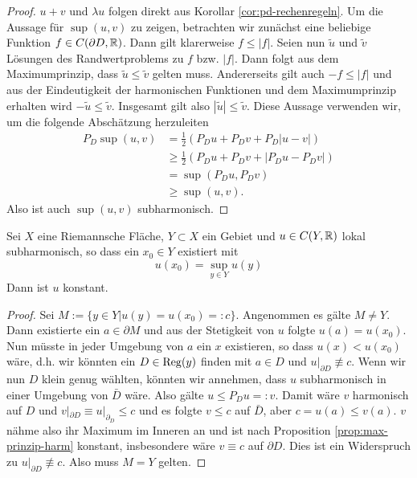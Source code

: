 \begin{proof}
  $u+v$ und $\lambda u$ folgen direkt aus Korollar
  \ref{cor:pd-rechenregeln}. Um die Aussage für $\sup(u,v)$ zu zeigen,
  betrachten wir zunächst eine beliebige Funktion $f \in C(\partial D,
  \mathbb{R})$. Dann gilt klarerweise $f \leq |f|$. Seien nun $\tilde u$ und
  $\tilde v$ Lösungen des Randwertproblems zu $f$ bzw. $|f|$. Dann
  folgt aus dem Maximumprinzip, dass $\tilde u \leq \tilde v$ gelten
  muss. Andererseits gilt auch $-f \leq |f|$ und aus der Eindeutigkeit
  der harmonischen Funktionen und dem Maximumprinzip erhalten wird $-
  \tilde u \leq \tilde v$. Insgesamt gilt also $|\tilde u| \leq \tilde
  v$. Diese Aussage verwenden wir, um die folgende Abschätzung herzuleiten
  \begin{align*}
    P_D \sup(u,v) & = \frac{1}{2} ( P_D u + P_D v + P_D|u - v|) \\
    & \geq \frac12 (P_D u + P_D v + |P_D u - P_D v|) \\
    & = \sup(P_D u, P_D v) \\
    & \geq \sup(u,v).
  \end{align*}
  Also ist auch $\sup(u,v)$ subharmonisch.
\end{proof}

\begin{thm}
  Sei $X$ eine Riemannsche Fläche, $Y \subset X$ ein Gebiet und $u
  \in C(Y, \mathbb{R})$ lokal subharmonisch, so dass ein $x_0 \in Y$ existiert
  mit
  \[
  u(x_0) = \sup_{y\in Y} u(y)
  \]
  Dann ist $u$ konstant.
\end{thm}

\begin{proof}
  Sei $M:= \{y \in Y | u(y) = u(x_0) =: c \}$. Angenommen es gälte $M \neq
  Y$. Dann existierte ein $a \in \partial M$ und aus der Stetigkeit
  von $u$ folgte $u(a) = u(x_0)$. Nun müsste in jeder Umgebung von $a$
  ein $x$ existieren, so dass $u(x) < u(x_0)$ wäre, d.h. wir könnten ein
  $D \in \operatorname{Reg}(y)$ finden mit $a \in D$ und $u|_{\partial D} \not
  \equiv c$. Wenn wir nun $D$ klein genug wählten, könnten wir annehmen, dass $u$
  subharmonisch in einer Umgebung von $\bar D$ wäre. Also gälte $u \leq
  P_D u =: v$. Damit wäre $v$ harmonisch auf $D$ und $v|_{\partial D} \equiv
  u|_{\partial_D} \leq c$ und es folgte $v \leq c$ auf $\bar D$, aber
  $c = u(a) \leq v(a)$. $v$ nähme also ihr Maximum im Inneren an und
  ist nach Proposition \ref{prop:max-prinzip-harm} konstant,
  insbesondere wäre $v \equiv c$ auf $\partial D$. Dies ist ein Widerspruch zu
  $u|_{\partial D} \not \equiv c$. Also muss $M = Y$ gelten.
\end{proof}

